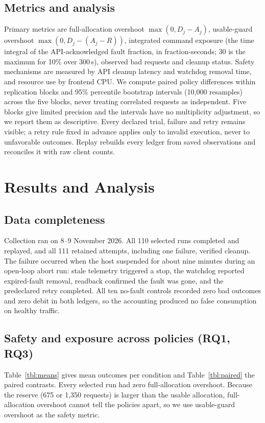 \documentclass[a4paper,fleqn,11pt]{cas-dc}
\begin{document}
\subsection{Metrics and analysis}
Primary metrics are full-allocation overshoot $\max(0,D_j-A_j)$, usable-guard overshoot $\max(0,D_j-(A_j-R))$, integrated command exposure (the time integral of the API-acknowledged fault fraction, in fraction-seconds; 30 is the maximum for 10\% over 300\,s), observed bad requests and cleanup status. Safety mechanisms are measured by API cleanup latency and watchdog removal time, and resource use by frontend CPU. We compute paired policy differences within replication blocks and 95\% percentile bootstrap intervals (10,000 resamples) across the five blocks, never treating correlated requests as independent. Five blocks give limited precision and the intervals have no multiplicity adjustment, so we report them as descriptive. Every declared trial, failure and retry remains visible; a retry rule fixed in advance applies only to invalid execution, never to unfavorable outcomes. Replay rebuilds every ledger from saved observations and reconciles it with raw client counts.

\FloatBarrier

\section{Results and Analysis}\label{sec:results}

\subsection{Data completeness}
Collection ran on 8--9 November 2026. All 110 selected runs completed and replayed, and all 111 retained attempts, including one failure, verified cleanup. The failure occurred when the host suspended for about nine minutes during an open-loop abort run: stale telemetry triggered a stop, the watchdog reported expired-fault removal, readback confirmed the fault was gone, and the predeclared retry completed. All ten no-fault controls recorded zero bad outcomes and zero debit in both ledgers, so the accounting produced no false consumption on healthy traffic.

\subsection{Safety and exposure across policies (RQ1, RQ3)}
Table~\ref{tbl:means} gives mean outcomes per condition and Table~\ref{tbl:paired} the paired contrasts. Every selected run had zero full-allocation overshoot. Because the reserve (675 or 1,350 requests) is larger than the usable allocation, full-allocation overshoot cannot tell the policies apart, so we use usable-guard overshoot as the safety metric.
\end{document}
